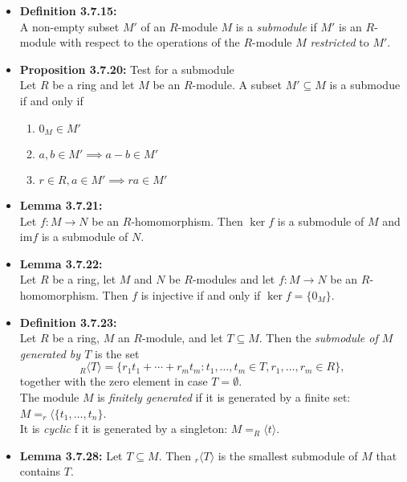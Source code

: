 \documentclass[11pt,a4paper]{article}
\begin{document}
\begin{itemize}
    \item \textbf{Definition 3.7.15:} \\
        A non-empty subset $M'$ of an $R$-module $M$ is a \emph{submodule} if $M'$ is an $R$-module
        with respect to the operations of the $R$-module $M$ \emph{restricted} to $M'$.

    \item \textbf{Proposition 3.7.20:} Test for a submodule \\
        Let $R$ be a ring and let $M$ be an $R$-module.
        A subset $M' \subseteq M$ is a submodue if and only if
        \begin{enumerate}
            \item $0_M \in M'$
            \item $a,b \in M' \implies a-b \in M'$
            \item $r \in R, a \in M' \implies ra \in M'$
        \end{enumerate}

    \item \textbf{Lemma 3.7.21:} \\
        Let $f : M \to N$ be an $R$-homomorphism.
        Then $\ker f$ is a submodule of $M$ and $\mathrm{im} f$ is a submodule of $N$.

    \item \textbf{Lemma 3.7.22:} \\
        Let $R$ be a ring, let $M$ and $N$ be $R$-modules and let $f : M \to N$ be an
        $R$-homomorphism.
        Then $f$ is injective if and only if $\ker f = \{0_M\}$.

    \item \textbf{Definition 3.7.23:} \\
        Let $R$ be a ring, $M$ an $R$-module, and let $T \subseteq M$.
        Then the \emph{submodule of $M$ generated by $T$} is the set
        \[
            _R \langle T \rangle = \{{r_1}{t_1} + \cdots + {r_m}{t_m} : t_1, \ldots, t_m \in T,
            r_1, \ldots, r_m \in R \},
        \]
        together with the zero element in case $T = \emptyset$.\\
        The module $M$ is \emph{finitely generated} if it is generated by a finite set:
        $M = _r \langle \{ t_1, \ldots, t_n \}$. \\
        It is \emph{cyclic} f it is generated by a singleton:
        $M = _R \langle t \rangle$.

    \item \textbf{Lemma 3.7.28:} Let $T \subseteq M$. Then $_r \langle T \rangle$
        is the smallest submodule of $M$ that contains $T$.


\end{itemize}
\end{document}
